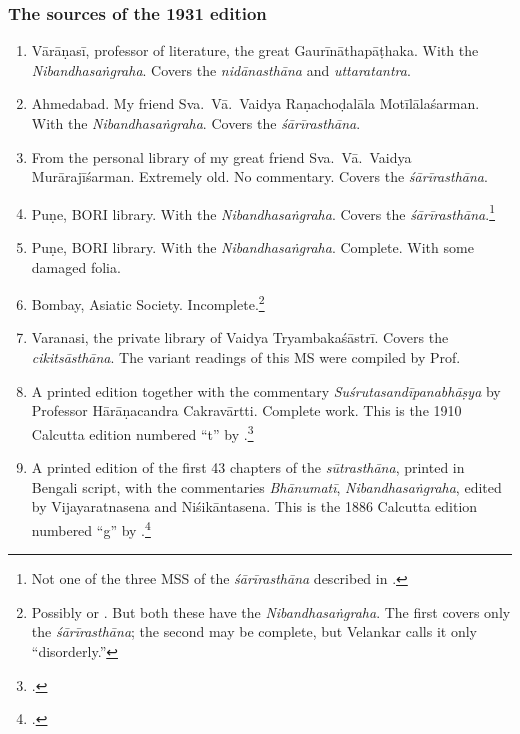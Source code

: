 \subsubsection{The sources of the 1931 edition}

\begin{enumerate}
    
    \item[1] Vārāṇasī, professor of literature, the great Gaurīnāthapāṭhaka.  With 
    the 
    \emph{Nibandhasaṅgraha}. Covers the \emph{nidānasthāna} and 
    \emph{uttaratantra}.
    
    \item [2]  Ahmedabad.  My friend Sva.\ Vā.\ Vaidya Raṇachoḍalāla 
    Motīlālaśarman.  
    With the \emph{Nibandhasaṅgraha}.  Covers the \emph{śārīrasthāna}.
    
    \item [3] From the personal library of my great friend Sva.\ Vā.\ Vaidya
    Murārajīśarman. Extremely old. No commentary.  Covers the 
    \emph{śārīrasthāna}.
    
    \item [4]  Puṇe, BORI library.  With the \emph{Nibandhasaṅgraha}. Covers the
    \emph{śārīrasthāna}.\footnote{Not one of the three MSS of the
    \emph{śārīrasthāna} described in \cite{shar-vaid}.}
    
    \item [5]  Puṇe, BORI library.  With the \emph{Nibandhasaṅgraha}. Complete.  
    With some damaged folia.
    
    \item [6]  Bombay, Asiatic Society.  Incomplete.\footnote{Possibly 
     or  \citep[v.\,1, \# 212 and 
    213]{vela-1930}.  But both these have the \emph{Nibandhasaṅgraha}.  The 
    first 
    covers only the \emph{śārīrasthāna}; the second may be complete, but 
    Velankar calls it 
    only “disorderly.”}
    
    \item [7] Varanasi, the private library of Vaidya Tryambakaśāstrī.  Covers the 
    \emph{cikitsāsthāna}.  The variant readings of this MS were compiled by Prof.\ 
    
    \item [8]  A printed edition together with the commentary 
    \emph{Suśrutasandīpanabhāṣya} by Professor Hārāṇacandra Cakravārtti. 
    Complete work.
    This is the 1910 Calcutta edition numbered “t” by \citet[IB, 
    312]{meul-hist}.\footcite{bhat-1917}
    
    \item [9] A printed edition of the first 43 chapters of the
    \emph{sūtrasthāna}, printed in Bengali script, with the commentaries
    \emph{Bhānumatī}, \emph{Nibandhasaṅgraha}, edited by Vijayaratnasena and
    Niśikāntasena. This is the 1886 Calcutta edition numbered “g” by \citet[IB,
    311]{meul-hist}.\footcite{sena-1886}
    
\end{enumerate}


